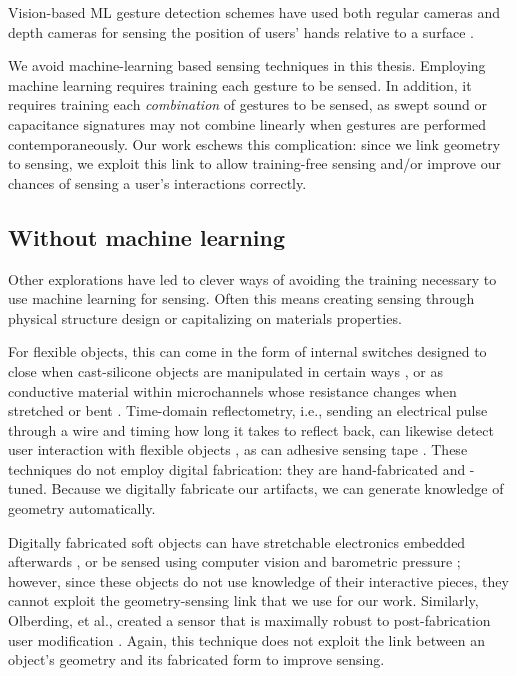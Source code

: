     Vision-based ML gesture detection schemes have used both regular cameras and depth cameras for sensing the position of users' hands relative to a surface \cite{fails-crayons,holman-sketchspace,klemmer-papiermache,macintyre-DART}.
    
    We avoid machine-learning based sensing techniques in this thesis. Employing machine learning requires training each gesture to be sensed. In addition, it requires training each \emph{combination} of gestures to be sensed, as swept sound or capacitance signatures may not combine linearly when gestures are performed contemporaneously. Our work eschews this complication: since we link geometry to sensing, we exploit this link to allow training-free sensing and/or improve our chances of sensing a user's interactions correctly.

    \subsection{Without machine learning}
        Other explorations have led to clever ways of avoiding the training necessary to use machine learning for sensing. Often this means creating sensing through physical structure design or capitalizing on materials properties.
        
        For flexible objects, this can come in the form of internal switches designed to close when cast-silicone objects are manipulated in certain ways \cite{slyper-structure}, or as conductive material within microchannels whose resistance changes when stretched or bent \cite{majidi-curvature, park-microchannels}. Time-domain reflectometry, i.e., sending an electrical pulse through a wire and timing how long it takes to reflect back, can likewise detect user interaction with flexible objects \cite{wimmer-tdr}, as can adhesive sensing tape \cite{holman-tactiletape}. These techniques do not employ digital fabrication: they are hand-fabricated and -tuned. Because we digitally fabricate our artifacts, we can generate knowledge of geometry automatically.
        
        Digitally fabricated soft objects can have stretchable electronics embedded afterwards \cite{yao-pneui}, or be sensed using computer vision and barometric pressure \cite{harrison-buttons, slyper-pressure}; however, since these objects do not use knowledge of their interactive pieces, they cannot exploit the geometry-sensing link that we use for our work. Similarly, Olberding, et al., created a sensor that is maximally robust to post-fabrication user modification \cite{olberding-cuttable}. Again, this technique does not exploit the link between an object's geometry and its fabricated form to improve sensing.

